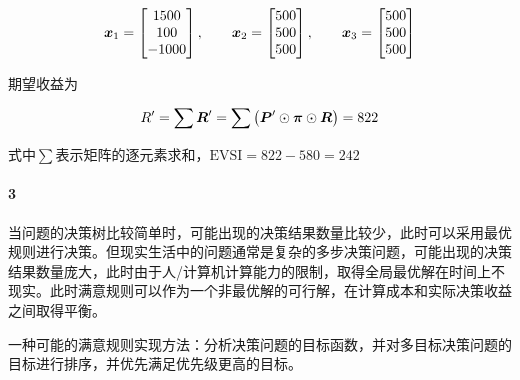 \documentclass{../notes}
\begin{document}
\begin{subquestions}
        \begin{equation}
            \boldsymbol x_1 = \begin{bmatrix}
                1500 \\ 100 \\ -1000
            \end{bmatrix}, \qquad \boldsymbol x_2 = \begin{bmatrix}
                500 \\ 500 \\ 500
            \end{bmatrix}, \qquad \boldsymbol x_3 = \begin{bmatrix}
                500 \\ 500 \\ 500
            \end{bmatrix}
        \end{equation}

        期望收益为

        \begin{equation}
            R' = \sum \boldsymbol R' = \sum \left(\boldsymbol P'\odot \boldsymbol \pi \odot \boldsymbol R\right) = 822
        \end{equation}

        式中$\sum$表示矩阵的逐元素求和，$\text{EVSI} = 822-580 = 242$
    \end{subquestions}

    \paragraph*{3} 当问题的决策树比较简单时，可能出现的决策结果数量比较少，此时可以采用最优规则进行决策。但现实生活中的问题通常是复杂的多步决策问题，可能出现的决策结果数量庞大，此时由于人/计算机计算能力的限制，取得全局最优解在时间上不现实。此时满意规则可以作为一个非最优解的可行解，在计算成本和实际决策收益之间取得平衡。

    一种可能的满意规则实现方法：分析决策问题的目标函数，并对多目标决策问题的目标进行排序，并优先满足优先级更高的目标。
\end{document}
